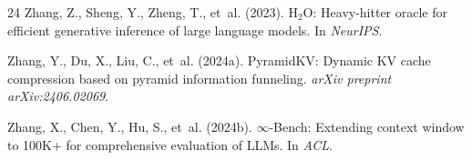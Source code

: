 \documentclass[10pt]{article}
\theoremstyle{definition}
\begin{document}
\begin{thebibliography}{24}
 Zhang, Z., Sheng, Y., Zheng, T., et~al. (2023). $\text{H}_2\text{O}$: Heavy-hitter oracle for efficient generative inference of large language models. In \textit{NeurIPS}.

 Zhang, Y., Du, X., Liu, C., et~al. (2024a). PyramidKV: Dynamic KV cache compression based on pyramid information funneling. \textit{arXiv preprint arXiv:2406.02069}.

 Zhang, X., Chen, Y., Hu, S., et~al. (2024b). $\infty$-Bench: Extending context window to 100K+ for comprehensive evaluation of LLMs. In \textit{ACL}.

\end{thebibliography}
\endgroup
\end{document}
